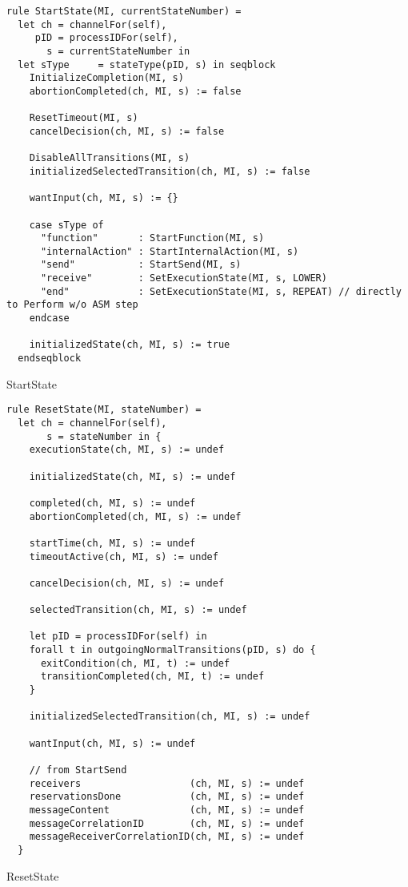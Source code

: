 \begin{listing}[H]
\begin{verbatim}
rule StartState(MI, currentStateNumber) =
  let ch = channelFor(self),
     pID = processIDFor(self),
       s = currentStateNumber in
  let sType     = stateType(pID, s) in seqblock
    InitializeCompletion(MI, s)
    abortionCompleted(ch, MI, s) := false

    ResetTimeout(MI, s)
    cancelDecision(ch, MI, s) := false

    DisableAllTransitions(MI, s)
    initializedSelectedTransition(ch, MI, s) := false

    wantInput(ch, MI, s) := {}

    case sType of
      "function"       : StartFunction(MI, s)
      "internalAction" : StartInternalAction(MI, s)
      "send"           : StartSend(MI, s)
      "receive"        : SetExecutionState(MI, s, LOWER)
      "end"            : SetExecutionState(MI, s, REPEAT) // directly to Perform w/o ASM step
    endcase

    initializedState(ch, MI, s) := true
  endseqblock
\end{verbatim}
\caption{StartState}
\label{lst:asm:StartState}
\end{listing}




\begin{listing}[H]
\begin{verbatim}
rule ResetState(MI, stateNumber) =
  let ch = channelFor(self),
       s = stateNumber in {
    executionState(ch, MI, s) := undef

    initializedState(ch, MI, s) := undef

    completed(ch, MI, s) := undef
    abortionCompleted(ch, MI, s) := undef

    startTime(ch, MI, s) := undef
    timeoutActive(ch, MI, s) := undef

    cancelDecision(ch, MI, s) := undef

    selectedTransition(ch, MI, s) := undef

    let pID = processIDFor(self) in
    forall t in outgoingNormalTransitions(pID, s) do {
      exitCondition(ch, MI, t) := undef
      transitionCompleted(ch, MI, t) := undef
    }

    initializedSelectedTransition(ch, MI, s) := undef

    wantInput(ch, MI, s) := undef

    // from StartSend
    receivers                   (ch, MI, s) := undef
    reservationsDone            (ch, MI, s) := undef
    messageContent              (ch, MI, s) := undef
    messageCorrelationID        (ch, MI, s) := undef
    messageReceiverCorrelationID(ch, MI, s) := undef
  }
\end{verbatim}
\caption{ResetState}
\label{lst:asm:ResetState}
\end{listing}




